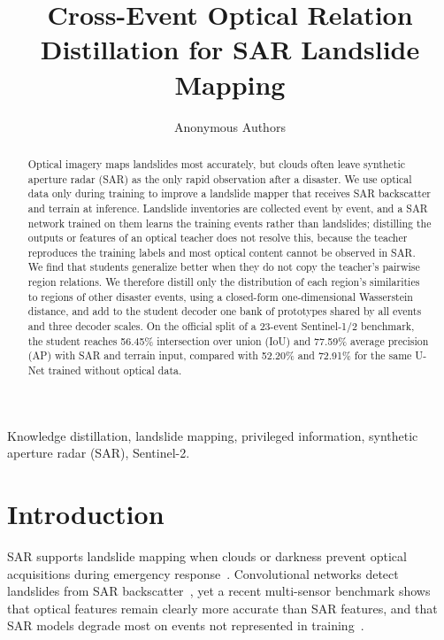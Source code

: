 \documentclass[journal]{IEEEtran}
\newcommand{\oursAP}{77.59}
\newcommand{\oursIoU}{56.45}
\begin{document}
\title{Cross-Event Optical Relation Distillation for SAR Landslide Mapping}
\author{Anonymous Authors}
\maketitle

\begin{abstract}
Optical imagery maps landslides most accurately, but clouds often leave synthetic aperture radar (SAR) as the only rapid observation after a disaster. We use optical data only during training to improve a landslide mapper that receives SAR backscatter and terrain at inference. Landslide inventories are collected event by event, and a SAR network trained on them learns the training events rather than landslides; distilling the outputs or features of an optical teacher does not resolve this, because the teacher reproduces the training labels and most optical content cannot be observed in SAR. We find that students generalize better when they do not copy the teacher's pairwise region relations. We therefore distill only the distribution of each region's similarities to regions of other disaster events, using a closed-form one-dimensional Wasserstein distance, and add to the student decoder one bank of prototypes shared by all events and three decoder scales. On the official split of a 23-event Sentinel-1/2 benchmark, the student reaches \oursIoU\% intersection over union (IoU) and \oursAP\% average precision (AP) with SAR and terrain input, compared with 52.20\% and 72.91\% for the same U-Net trained without optical data.
\end{abstract}

\begin{IEEEkeywords}
Knowledge distillation, landslide mapping, privileged information, synthetic aperture radar (SAR), Sentinel-2.
\end{IEEEkeywords}

\section{Introduction}
SAR supports landslide mapping when clouds or darkness prevent optical acquisitions during emergency response~\cite{Mondini2021,Handwerger2022,Amatya2023}. Convolutional networks detect landslides from SAR backscatter~\cite{Nava2022DL,Nava2022Attention,Boehm2022}, yet a recent multi-sensor benchmark shows that optical features remain clearly more accurate than SAR features, and that SAR models degrade most on events not represented in training~\cite{Orynbaikyzy2025}.
\end{document}
